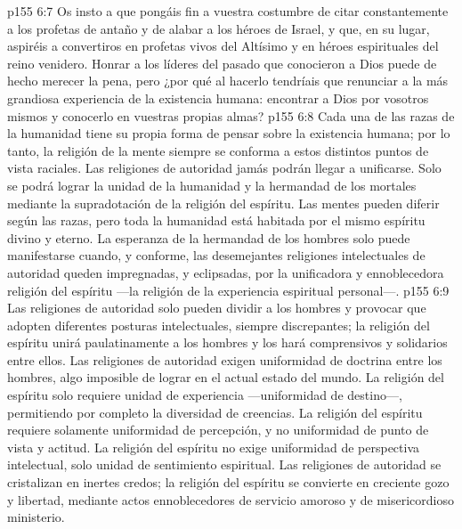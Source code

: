 \vs p155 6:7 Os insto a que pongáis fin a vuestra costumbre de citar constantemente a los profetas de antaño y de alabar a los héroes de Israel, y que, en su lugar, aspiréis a convertiros en profetas vivos del Altísimo y en héroes espirituales del reino venidero. Honrar a los líderes del pasado que conocieron a Dios puede de hecho merecer la pena, pero ¿por qué al hacerlo tendríais que renunciar a la más grandiosa experiencia de la existencia humana: encontrar a Dios por vosotros mismos y conocerlo en vuestras propias almas?
\vs p155 6:8 Cada una de las razas de la humanidad tiene su propia forma de pensar sobre la existencia humana; por lo tanto, la religión de la mente siempre se conforma a estos distintos puntos de vista raciales. Las religiones de autoridad jamás podrán llegar a unificarse. Solo se podrá lograr la unidad de la humanidad y la hermandad de los mortales mediante la supradotación de la religión del espíritu. Las mentes pueden diferir según las razas, pero toda la humanidad está habitada por el mismo espíritu divino y eterno. La esperanza de la hermandad de los hombres solo puede manifestarse cuando, y conforme, las desemejantes religiones intelectuales de autoridad queden impregnadas, y eclipsadas, por la unificadora y ennoblecedora religión del espíritu ---la religión de la experiencia espiritual personal---.
\vs p155 6:9 Las religiones de autoridad solo pueden dividir a los hombres y provocar que adopten diferentes posturas intelectuales, siempre discrepantes; la religión del espíritu unirá paulatinamente a los hombres y los hará comprensivos y solidarios entre ellos. Las religiones de autoridad exigen uniformidad de doctrina entre los hombres, algo imposible de lograr en el actual estado del mundo. La religión del espíritu solo requiere unidad de experiencia ---uniformidad de destino---, permitiendo por completo la diversidad de creencias. La religión del espíritu requiere solamente uniformidad de percepción, y no uniformidad de punto de vista y actitud. La religión del espíritu no exige uniformidad de perspectiva intelectual, solo unidad de sentimiento espiritual. Las religiones de autoridad se cristalizan en inertes credos; la religión del espíritu se convierte en creciente gozo y libertad, mediante actos ennoblecedores de servicio amoroso y de misericordioso ministerio.

